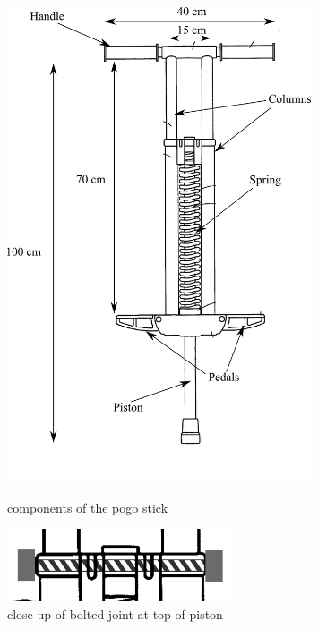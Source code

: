 \documentclass[
10pt,
a4paper,
openany,
svgnames,
]{book}
\begin{document}
\begin{exercises}
  \begin{figure}[H]
    \begin{minipage}[b]{0.6\textwidth}
      \centering
      \includegraphics[width=0.8\textwidth]{pictures/Machine-interaction/pogostick}
      \caption{components of the pogo stick}
      \label{fig1}
    \end{minipage}
    \hfill
    \begin{minipage}[b]{0.4\textwidth}
      \centering
      \includegraphics[width=0.6\textwidth]{pictures/Machine-interaction/pogostick-bolt}
      \caption{close-up of bolted joint at top of piston}
      \label{fig2}

\end{minipage}
\end{figure}
\end{exercises}
\end{document}
